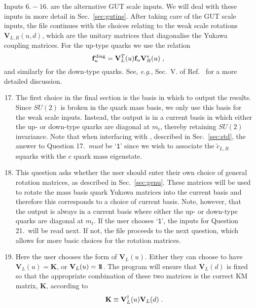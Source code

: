 Inputs $6.-16.$ are the alternative GUT scale inputs. We will deal with
these inputs in more detail in Sec.~\ref{sec:gutins}. After taking care
of the GUT scale inputs, the file continues with the choices relating to
the weak scale rotations ${\mathbf{V}}_{L,R}(u,d)$, which are the
unitary matrices that diagonalise the Yukawa coupling matrices. For the
up-type quarks we use the relation
\begin{equation}\label{eq:yukrot}
{{\mathbf{f}}}^{\mathrm{diag}}_{u}={\mathbf{V}}^{T}_{L}(u){{\mathbf{f}}}_{u}{\mathbf{V}}^{*}_{R}(u)\;,
\end{equation} and similarly for the down-type quarks. See,
\textit{e.g.}, Sec.~V. of Ref.~\cite{RGE1} for a more detailed
discussion.
\begin{enumerate}\setcounter{enumi}{16}
\item The first choice in the final section is the basis in which to output the results. Since $SU(2)$ is broken in the quark mass basis, we only use this basis for the weak scale inputs. Instead, the output is in a current basis in which either the up- or down-type quarks are diagonal at $m_{t}$, thereby retaining $SU(2)$ invariance. Note that when interfacing with \progstd, described in Sec.~\ref{sec:std}, the answer to Question 17.~\textit{must} be `\verb+1+' since we wish to associate the $\tilde{c}_{L,R}$ squarks with the $c$ quark mass eigenstate.
\item This question asks whether the user should enter their own choice of general rotation matrices, as described in Sec.~\ref{sec:genu}. These matrices will be used to rotate the mass basis quark Yukawa matrices into the current basis and therefore this corresponds to a choice of current basis. Note, however, that the output is always in a current basis where either the up- or down-type quarks are diagonal at $m_{t}$. If the user chooses `\verb+1+', the inputs for Question 21.~will be read next. If not, the file proceeds to the next question, which allows for more basic choices for the rotation matrices.
\item Here the user chooses the form of ${\mathbf{V}}_{L}(u)$. Either
they can choose to have ${\mathbf{V}}_{L}(u)={\mathbf{K}}$, or
${\mathbf{V}}_{L}(u)=\dblone$. The program will ensure that
${\mathbf{V}}_{L}(d)$ is fixed so that the appropriate combination of
these two matrices is the correct KM matrix, ${\mathbf{K}}$, according
to %
\begin{equation}\label{eq:vudkm}
{\mathbf{K}}\equiv{{\bf{V}}^\dagger_L}(u) {\bf{V}}_L(d)\;.
\end{equation} %

\end{enumerate}
